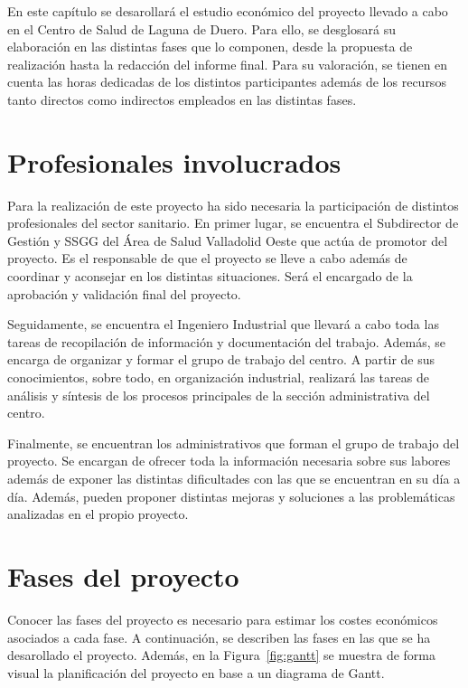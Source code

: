 En este capítulo se desarollará el estudio económico del proyecto llevado a cabo en el Centro de Salud de Laguna de Duero.
Para ello, se desglosará su elaboración en las distintas fases que lo componen, desde la propuesta de realización hasta la redacción del informe final.
Para su valoración, se tienen en cuenta las horas dedicadas de los distintos participantes además de los recursos tanto directos como indirectos empleados en las distintas fases.

\section{Profesionales involucrados}

Para la realización de este proyecto ha sido necesaria la participación de distintos profesionales del sector sanitario.
En primer lugar, se encuentra el Subdirector de Gestión y SSGG del Área de Salud Valladolid Oeste que actúa de promotor del proyecto.
Es el responsable de que el proyecto se lleve a cabo además de coordinar y aconsejar en los distintas situaciones.
Será el encargado de la aprobación y validación final del proyecto.

Seguidamente, se encuentra el Ingeniero Industrial que llevará a cabo toda las tareas de recopilación de información y documentación del trabajo.
Además, se encarga de organizar y formar el grupo de trabajo del centro.
A partir de sus conocimientos, sobre todo, en organización industrial, realizará las tareas de análisis y síntesis de los procesos principales de la sección administrativa del centro.

Finalmente, se encuentran los administrativos que forman el grupo de trabajo del proyecto.
Se encargan de ofrecer toda la información necesaria sobre sus labores además de exponer las distintas dificultades con las que se encuentran en su día a día.
Además, pueden proponer distintas mejoras y soluciones a las problemáticas analizadas en el propio proyecto.

\section{Fases del proyecto}

Conocer las fases del proyecto es necesario para estimar los costes económicos asociados a cada fase.
A continuación, se describen las fases en las que se ha desarollado el proyecto.
Además, en la Figura~\ref{fig:gantt} se muestra de forma visual la planificación del proyecto en base a un diagrama de Gantt.

